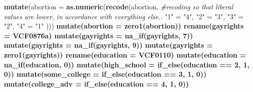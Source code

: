 \documentclass[
]{article}
\newenvironment{Shaded}{\begin{snugshade}}{\end{snugshade}}
\newcommand{\CommentTok}[1]{\textcolor[rgb]{0.56,0.35,0.01}{\textit{#1}}}
\newcommand{\DataTypeTok}[1]{\textcolor[rgb]{0.13,0.29,0.53}{#1}}
\newcommand{\DecValTok}[1]{\textcolor[rgb]{0.00,0.00,0.81}{#1}}
\newcommand{\KeywordTok}[1]{\textcolor[rgb]{0.13,0.29,0.53}{\textbf{#1}}}
\newcommand{\NormalTok}[1]{#1}
\newcommand{\OperatorTok}[1]{\textcolor[rgb]{0.81,0.36,0.00}{\textbf{#1}}}
\newcommand{\StringTok}[1]{\textcolor[rgb]{0.31,0.60,0.02}{#1}}
\begin{document}
\begin{Shaded}
\begin{Highlighting}[]
{{{{{{{{{{{{{{{{{{{{{{{{{{{{{{{{{{{{{{{{{{\StringTok{    }\KeywordTok{mutate}\NormalTok{(}\DataTypeTok{abortion =} \KeywordTok{as.numeric}\NormalTok{(}\KeywordTok{recode}\NormalTok{(abortion, }\CommentTok{#recoding so that liberal values are lower, in accordance with everything else..}
                                                                            \StringTok{"1"}\NormalTok{ =}\StringTok{ "4"}\NormalTok{,}
                                                                            \StringTok{"2"}\NormalTok{ =}\StringTok{ "3"}\NormalTok{,}
                                                                            \StringTok{"3"}\NormalTok{ =}\StringTok{ "2"}\NormalTok{,}
                                                                            \StringTok{"4"}\NormalTok{ =}\StringTok{ "1"}
\NormalTok{    )))}\OperatorTok{%>%}
\StringTok{    }\KeywordTok{mutate}\NormalTok{(}\DataTypeTok{abortion =} \KeywordTok{zero1}\NormalTok{(abortion))}\OperatorTok{%>%}
\StringTok{    }\KeywordTok{rename}\NormalTok{(}\DataTypeTok{gayrights =}\NormalTok{ VCF0876a)}\OperatorTok{%>%}
\StringTok{    }\KeywordTok{mutate}\NormalTok{(}\DataTypeTok{gayrights =} \KeywordTok{na_if}\NormalTok{(gayrights, }\DecValTok{7}\NormalTok{))}\OperatorTok{%>%}
\StringTok{    }\KeywordTok{mutate}\NormalTok{(}\DataTypeTok{gayrights =} \KeywordTok{na_if}\NormalTok{(gayrights, }\DecValTok{9}\NormalTok{))}\OperatorTok{%>%}
\StringTok{    }\KeywordTok{mutate}\NormalTok{(}\DataTypeTok{gayrights =} \KeywordTok{zero1}\NormalTok{(gayrights))}\OperatorTok{%>%}
\StringTok{    }\KeywordTok{rename}\NormalTok{(}\DataTypeTok{education =}\NormalTok{ VCF0110)}\OperatorTok{%>%}\CommentTok{#education 1 (grade school), 2(High School), 3(Some College), 4(College/advanced) 0DK/NA}
\StringTok{    }\KeywordTok{mutate}\NormalTok{(}\DataTypeTok{education =} \KeywordTok{na_if}\NormalTok{(education, }\DecValTok{0}\NormalTok{))}\OperatorTok{%>%}
\StringTok{    }\KeywordTok{mutate}\NormalTok{(}\DataTypeTok{high_school =} \KeywordTok{if_else}\NormalTok{(education }\OperatorTok{==}\StringTok{ }\DecValTok{2}\NormalTok{, }\DecValTok{1}\NormalTok{, }\DecValTok{0}\NormalTok{))}\OperatorTok{%>%}\StringTok{ }\CommentTok{#creating education dummies. grade school is ref. cat.}
\StringTok{    }\KeywordTok{mutate}\NormalTok{(}\DataTypeTok{some_college =} \KeywordTok{if_else}\NormalTok{(education }\OperatorTok{==}\StringTok{ }\DecValTok{3}\NormalTok{, }\DecValTok{1}\NormalTok{, }\DecValTok{0}\NormalTok{))}\OperatorTok{%>%}
\StringTok{    }\KeywordTok{mutate}\NormalTok{(}\DataTypeTok{college_adv =} \KeywordTok{if_else}\NormalTok{(education }\OperatorTok{==}\StringTok{ }\DecValTok{4}\NormalTok{, }\DecValTok{1}\NormalTok{, }\DecValTok{0}\NormalTok{))}\OperatorTok{%>%}
}}}}}}}}}}}}}}}}}}}}}}}}}}}}}}}}}}}}}}}}}}}}}}}}}}}}}
\end{Highlighting}
\end{Shaded}
\end{document}
